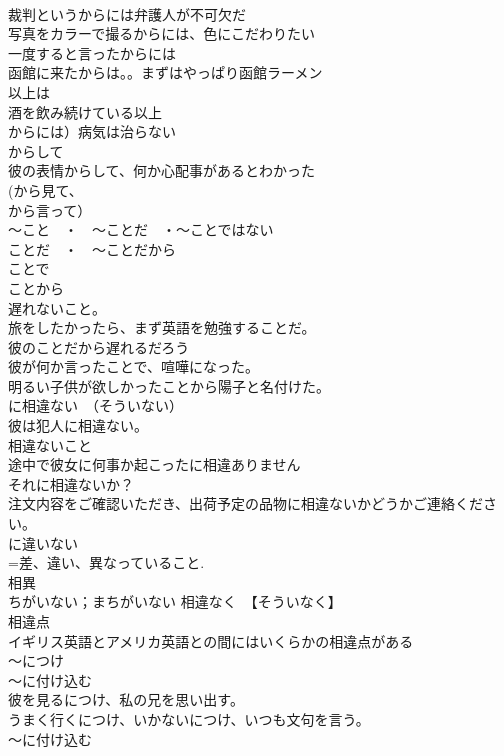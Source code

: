 \documentclass[8pt]{extreport}
\begin{document}
\begin{CJK}{UTF8}{min}
\\	裁判というからには弁護人が不可欠だ 
\\	写真をカラーで撮るからには、色にこだわりたい 
\\	一度すると言ったからには 
\\	函館に来たからは。。まずはやっぱり函館ラーメン
\\	以上は 
\\	酒を飲み続けている以上
\\	からには）病気は治らない 
\\	からして 
\\	彼の表情からして、何か心配事があるとわかった 
\\	(から見て、
\\	から言って）
\\	～こと　・　～ことだ　・～ことではない 
\\	ことだ　・　～ことだから 
\\	ことで 
\\	ことから	
\\	遅れないこと。
\\	旅をしたかったら、まず英語を勉強することだ。
\\	彼のことだから遅れるだろう 
\\	彼が何か言ったことで、喧嘩になった。
\\	明るい子供が欲しかったことから陽子と名付けた。
\\	に相違ない　（そういない）	
\\	彼は犯人に相違ない。 
\\	相違ないこと 　
\\	途中で彼女に何事か起こったに相違ありません 
\\	それに相違ないか？ 
\\	注文内容をご確認いただき、出荷予定の品物に相違ないかどうかご連絡ください。 
\\	に違いない
\\	=差、違い、異なっていること. 
\\	相異 
\\	ちがいない；まちがいない 相違なく　【そういなく】　
\\	相違点 
\\	イギリス英語とアメリカ英語との間にはいくらかの相違点がある 
\\	～につけ
\\	～に付け込む	
\\	彼を見るにつけ、私の兄を思い出す。
\\	うまく行くにつけ、いかないにつけ、いつも文句を言う。
\\	～に付け込む 

\end{CJK}
\end{document}
